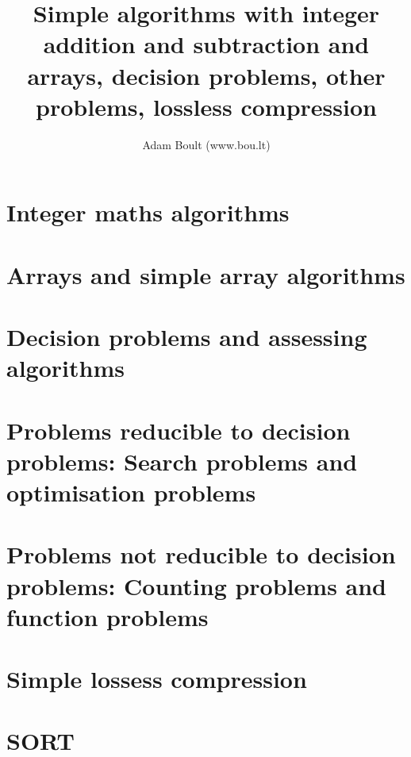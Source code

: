 \documentclass[oneside]{book}
\begin{document}
\author{Adam Boult (www.bou.lt)}
\title{Simple algorithms with integer addition and subtraction and arrays, decision problems, other problems, lossless compression}
\maketitle

\setcounter{tocdepth}{0}
\tableofcontents



\part{Integer maths algorithms}






\part{Arrays and simple array algorithms}











\part{Decision problems and assessing algorithms}








\part{Problems reducible to decision problems: Search problems and optimisation problems}



\part{Problems not reducible to decision problems: Counting problems and function problems}





\part{Simple lossess compression}


\part{SORT}

\end{document}
